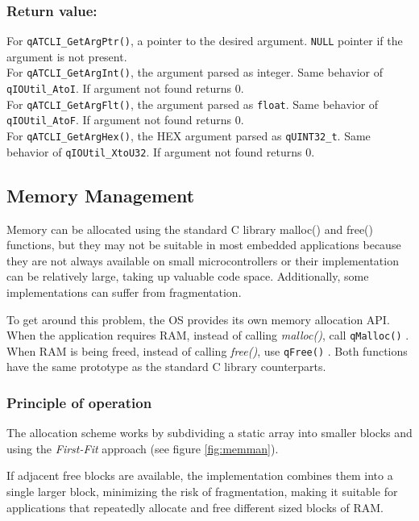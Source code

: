 \documentclass{article}
\begin{document}
\subsubsection*{Return value:}
For \lstinline{qATCLI_GetArgPtr()}, a pointer to the desired argument. \lstinline{NULL} pointer if the argument is not present. \\
For \lstinline{qATCLI_GetArgInt()}, the argument parsed as integer. Same behavior of \lstinline{qIOUtil_AtoI}. If argument not found returns 0.\\
For \lstinline{qATCLI_GetArgFlt()}, the argument parsed as \lstinline{float}. Same behavior of \lstinline{qIOUtil_AtoF}. If argument not found returns 0.\\
For \lstinline{qATCLI_GetArgHex()}, the HEX argument parsed as \lstinline{qUINT32_t}. Same behavior of \lstinline{qIOUtil_XtoU32}. If argument not found returns 0.

\subsection{Memory Management} \label{memmanagement}
Memory can be allocated using the standard C library malloc() and free() functions, but they may not be suitable in most embedded applications because they are not always available on small microcontrollers or their implementation can be relatively large, taking up valuable code space. Additionally, some implementations can suffer from fragmentation.

To get around this problem, the OS  provides its own memory allocation API. When the application requires RAM, instead of calling \textit{malloc()},  call \lstinline{qMalloc()} . When RAM is being freed, instead of calling \textit{free()}, use \lstinline{qFree()} . Both functions have the same prototype as the standard C library counterparts.

\subsubsection{Principle of operation}
The allocation scheme works by subdividing a static array into smaller blocks and using the \textit{First-Fit} approach (see figure \ref{fig:memman}). 



If adjacent free blocks are available, the implementation combines them into a single larger block, minimizing the risk of fragmentation, making it suitable for applications that repeatedly allocate and free different sized blocks of RAM. \\
\end{document}

